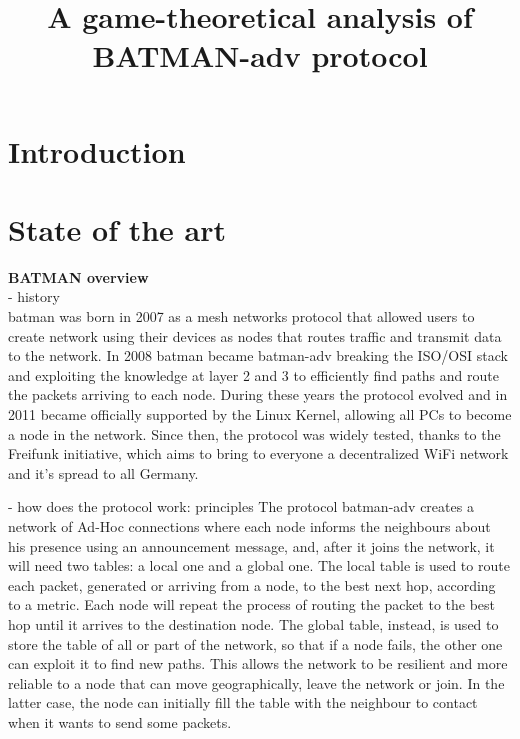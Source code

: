 \documentclass[conference]{IEEEtran}
\begin{document}
\title{A game-theoretical analysis of BATMAN-adv protocol}

\author{
\and
{}
}

\maketitle

\begin{abstract}

\end{abstract}

\section{Introduction}

\section{State of the art}

\textbf{BATMAN overview}\\

- history\\
\gls{batman} was born in 2007 as a mesh networks protocol that allowed users to create network using their devices as nodes that routes traffic and transmit data to the network. In 2008 \gls{batman} became \gls{batman}-adv breaking the ISO/OSI stack and exploiting the knowledge at layer 2 and 3 to efficiently find paths and route the packets arriving to each node. During these years the protocol evolved and in 2011 became officially supported by the Linux Kernel, allowing all PCs to become a node in the network. Since then, the protocol was widely tested, thanks to the Freifunk initiative, which aims to bring to everyone a decentralized WiFi network and it's spread to all Germany.

- how does the protocol work: principles
The protocol \gls{batman}-adv creates a network of Ad-Hoc connections where each node informs the neighbours about his presence using an announcement message, and, after it joins the network, it will need two tables: a local one and a global one. The local table is used to route each packet, generated or arriving from a node, to the best next hop, according to a metric. Each node will repeat the process of routing the packet to the best hop until it arrives to the destination node. The global table, instead, is used to store the table of all or part of the network, so that if a node fails, the other one can exploit it to find new paths. This allows the network to be resilient and more reliable to a node that can move geographically, leave the network or join. In the latter case, the node can initially fill the table with the neighbour to contact when it wants to send some packets. 
\end{document}
